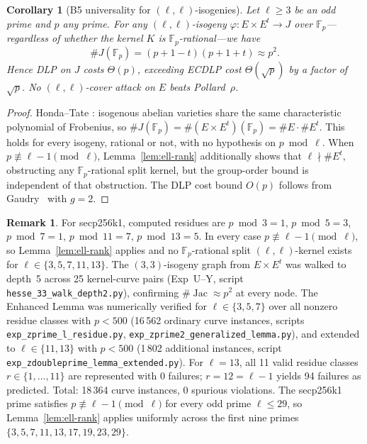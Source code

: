 \documentclass[11pt,a4paper]{article}
\newtheorem{corollary}[theorem]{Corollary}
\theoremstyle{definition}
\newtheorem{remark}[theorem]{Remark}
\newcommand{\FF}{\mathbb{F}}
\newcommand{\Jac}{\operatorname{Jac}}
\begin{document}
\begin{corollary}[B5 universality for $(\ell,\ell)$-isogenies]\label{cor:b5-univ}
Let $\ell \geq 3$ be an odd prime and $p$ any prime.
For \emph{any} $(\ell,\ell)$-isogeny $\varphi\colon E \times E^t \to J$
over $\FF_p$---regardless of whether the kernel $K$ is
$\FF_p$-rational---we have
\[
  \#J(\FF_p) = (p+1-t)(p+1+t) \approx p^2.
\]
Hence DLP on $J$ costs $\Theta(p)$, exceeding ECDLP cost
$\Theta(\sqrt{p})$ by a factor of $\sqrt{p}$.  No $(\ell,\ell)$-cover
attack on $E$ beats Pollard~$\rho$.
\end{corollary}

\begin{proof}
Honda--Tate \cite{tate1966}: isogenous abelian varieties share the
same characteristic polynomial of Frobenius, so
$\#J(\FF_p) = \#(E \times E^t)(\FF_p) = \#E \cdot \#E^t$.
This holds for every isogeny, rational or not, with no hypothesis on
$p \bmod \ell$.  When $p \not\equiv \ell{-}1 \pmod\ell$,
Lemma~\ref{lem:ell-rank} additionally shows that
$\ell \nmid \#E^t$, obstructing any $\FF_p$-rational split kernel,
but the group-order bound is independent of that obstruction.
The DLP cost bound $O(p)$ follows from
Gaudry~\cite{gaudry2000} with $g = 2$.
\end{proof}

\begin{remark}
For secp256k1, computed residues are $p \bmod 3 = 1$, $p \bmod 5 = 3$,
$p \bmod 7 = 1$, $p \bmod 11 = 7$, $p \bmod 13 = 5$.  In every case
$p \not\equiv \ell{-}1 \pmod\ell$, so Lemma~\ref{lem:ell-rank} applies
and no $\FF_p$-rational split $(\ell,\ell)$-kernel exists for
$\ell \in \{3,5,7,11,13\}$.
The $(3,3)$-isogeny graph from $E \times E^t$ was walked to depth~5
across 25 kernel-curve pairs (Exp~U--Y, script
\texttt{hesse\_33\_walk\_depth2.py}),
confirming $\#\Jac \approx p^2$ at every node.
The Enhanced Lemma was numerically verified for $\ell \in \{3,5,7\}$
over all nonzero residue classes with $p < 500$ (16\,562 ordinary curve instances,
scripts \texttt{exp\_zprime\_l\_residue.py},
\texttt{exp\_zprime2\_generalized\_lemma.py}),
and extended to $\ell \in \{11,13\}$ with $p < 500$ (1\,802 additional instances,
script \texttt{exp\_zdoubleprime\_lemma\_extended.py}).
For $\ell = 13$, all 11 valid residue classes $r \in \{1,\ldots,11\}$
are represented with $0$ failures; $r = 12 = \ell{-}1$ yields 94 failures
as predicted.  Total: 18\,364 curve instances, $0$ spurious violations.
The secp256k1 prime satisfies $p \not\equiv \ell{-}1 \pmod{\ell}$ for every
odd prime $\ell \leq 29$, so Lemma~\ref{lem:ell-rank} applies uniformly
across the first nine primes $\{3,5,7,11,13,17,19,23,29\}$.
\end{remark}
\end{document}
